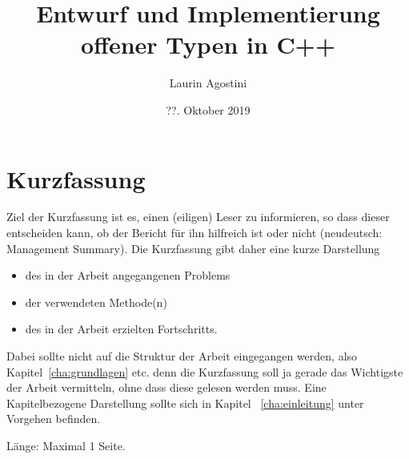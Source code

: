\documentclass[oneside]{ausarbeitung}
\begin{document}



\title{Entwurf und Implementierung offener Typen in C++}

\author{Laurin Agostini}

\date{??. Oktober 2019}

\maketitle
\cleardoublepage

\setcounter{page}{1}

\makeaffirmation
\cleardoublepage

\chapter*{Kurzfassung}

Ziel der Kurzfassung ist es, einen (eiligen) Leser zu informieren, so 
dass dieser entscheiden kann, ob der Bericht für ihn hilfreich ist oder 
nicht (neudeutsch: Management Summary). Die Kurzfassung gibt daher eine 
kurze Darstellung

\begin{itemize}
  \item des in der Arbeit angegangenen Problems
  \item der verwendeten Methode(n)
  \item des in der Arbeit erzielten Fortschritts.
\end{itemize}

Dabei sollte nicht auf die Struktur der Arbeit eingegangen werden, also 
Kapitel~\ref{cha:grundlagen} etc. denn die Kurzfassung soll ja gerade 
das Wichtigste der Arbeit vermitteln, ohne dass diese gelesen werden muss. Eine Kapitelbezogene Darstellung sollte sich in Kapitel~%
\ref{cha:einleitung} unter Vorgehen befinden.

Länge: Maximal 1 Seite.

\cleardoublepage
{}
\tableofcontents
\end{document}
